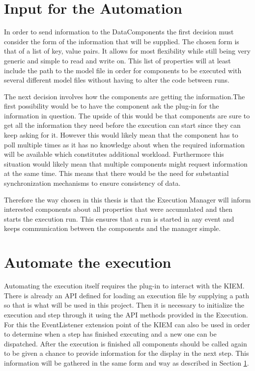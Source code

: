 \section{Input for the Automation}
\label{section:AutoConceptsInput}
In order to send information to the DataComponents the first decision must consider the
form of the information that will be supplied.
The chosen form is that of a list of key, value pairs. It allows for most
flexibility while still being very generic and simple to read and write on.
This list of properties will at least include the path to the model file in order
for components to be executed with several different model files without having
to alter the code between runs.

The next decision involves how the components are getting the information.The first possibility 
would be to have the component ask the plug-in for the information
in question. The upside of this would be that components are sure to get all the information
they need before the execution can start since they can keep asking for it. However this would
likely mean that the component has to poll multiple times as it has no knowledge about when
the required information will be available which constitutes additional workload. Furthermore
this situation would likely mean that multiple components might request information
at the same time. This means that there would be the need for substantial synchronization mechanisms
to ensure consistency of data.

Therefore the way chosen in this thesis is that the Execution Manager will inform interested components
about all properties that were accumulated and then starts the execution run. This ensures
that a run is started in any event and keeps communication between the components and the manager simple.

\section{Automate the execution}
\label{section:AutoConceptsExecution}
Automating the execution itself requires the plug-in to interact with the KIEM.
There is already an API defined for loading an execution file by supplying a path so that
is what will be used in this project.
Then it is necessary to initialize the execution and step through it using the API
methods provided in the Execution. For this the EventListener extension point of the 
KIEM can also be used in order to determine when a step has finished executing and
a new one can be dispatched.
After the execution is finished all components should be called again to be given
a chance to provide information for the display in the next step. This information
will be gathered in the same form and way as described in Section \ref{section:AutoConceptsInput}.


